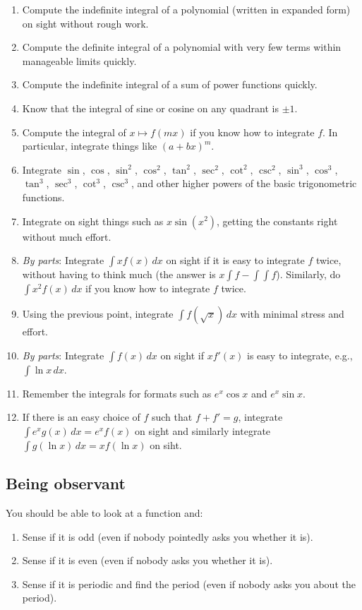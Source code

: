 \documentclass[10pt]{amsart}
\begin{document}
\begin{enumerate}
\item Compute the indefinite integral of a polynomial (written in
  expanded form) on sight without rough work.
\item Compute the definite integral of a polynomial with very few
  terms within manageable limits quickly.
\item Compute the indefinite integral of a sum of power functions
  quickly.
\item Know that the integral of sine or cosine on any quadrant is $\pm
  1$.
\item Compute the integral of $x \mapsto f(mx)$ if you know how to
  integrate $f$. In particular, integrate things like $(a + bx)^m$.
\item Integrate $\sin$, $\cos$, $\sin^2$, $\cos^2$, $\tan^2$,
  $\sec^2$, $\cot^2$, $\csc^2$, $\sin^3$, $\cos^3$, $\tan^3$,
  $\sec^3$, $\cot^3$, $\csc^3$, and other higher powers of the basic
  trigonometric functions.
\item Integrate on sight things such as $x\sin(x^2)$, getting the
  constants right without much effort.
\item {\em By parts}: Integrate $\int xf(x) \, dx$ on sight if it is
  easy to integrate $f$ twice, without having to think much (the
  answer is $x \int f - \int \int f$). Similarly, do $\int x^2f(x) \,
  dx$ if you know how to integrate $f$ twice.
\item Using the previous point, integrate $\int f(\sqrt{x}) \, dx$
  with minimal stress and effort.
\item {\em By parts}: Integrate $\int f(x) \, dx$ on sight if $xf'(x)$
  is easy to integrate, e.g., $\int \ln x \, dx$.
\item Remember the integrals for formats such as $e^x \cos x$ and $e^x
  \sin x$.
\item If there is an easy choice of $f$ such that $f + f' = g$,
  integrate $\int e^xg(x) \, dx = e^xf(x)$ on sight and similarly
  integrate $\int g(\ln x) \, dx = xf(\ln x)$ on siht.
\end{enumerate}
\subsection{Being observant}

You should be able to look at a function and:

\begin{enumerate}
\item Sense if it is odd (even if nobody pointedly asks you whether it
  is).
\item Sense if it is even (even if nobody asks you whether it is).
\item Sense if it is periodic and find the period (even if nobody asks
  you about the period).
\end{enumerate}
\end{document}
